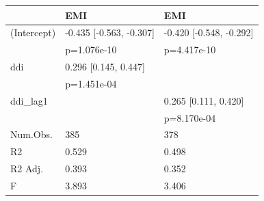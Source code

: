 \begin{tabular}{lll}
\hline
& EMI & EMI  \\ \hline
(Intercept) & -0.435 [-0.563, -0.307] & -0.420 [-0.548, -0.292] \\
& p=1.076e-10 & p=4.417e-10 \\
ddi & 0.296 [0.145, 0.447] &  \\
& p=1.451e-04 &  \\
ddi_lag1 &  & 0.265 [0.111, 0.420] \\
&  & p=8.170e-04 \\
Num.Obs. & 385 & 378 \\
R2 & 0.529 & 0.498 \\
R2 Adj. & 0.393 & 0.352 \\
F & 3.893 & 3.406 \\
\hline
\end{tabular}
